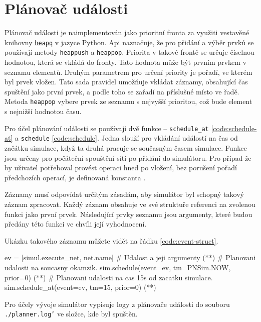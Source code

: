 \section{Plánovač události}
\label{sec:event-planner}

Plánovač události je naimplementován jako prioritní fronta za využiti vestavěné knihovny \href{https://docs.python.org/3/library/heapq.html}{\texttt{heapq}} v jazyce Python. Api naznačuje, že pro přidání a výběr prvků se používají metody \texttt{heappush} a \texttt{heappop}. Priorita v takové frontě se určuje číselnou hodnotou, která se vkládá do fronty. Tato hodnota může být prvním prvkem v seznamu elementů. Druhým parametrem pro určení priority je pořadí, ve kterém byl prvek vložen. Tato sada pravidel umožňuje vkládat záznamy, obsahující čas spuštění jako první prvek, a podle toho se zařadí na příslušné místo ve řadě. Metoda \texttt{heappop} vybere prvek ze seznamu s nejvyšší prioritou, což bude element s nejnižší hodnotou času.

Pro účel plánování události se používají dvě funkce -- \texttt{schedule\_at} \ref{code:schedule-at} a \texttt{schedule} \ref{code:schedule}. Jedna slouží pro vkládání událostí na čas od začátku simulace, když ta druhá pracuje se současným časem simulace. Funkce jsou určeny pro počáteční spouštění sítí po přidání do simulátoru. Pro případ že by uživatel potřeboval provést operaci hned po vložení, bez porušení pořadí předchozích operací, je definovaná konstanta .

Záznamy musí odpovídat určitým zásadám, aby simulátor byl schopný takový záznam zpracovat. Každý záznam obsahuje ve své struktuře referenci na zvolenou funkci jako první prvek. Následující prvky seznamu jsou argumenty, které budou předány této funkci ve chvíli její vyhodnocení.

Ukázku takového záznamu můžete vidět na řádku \ref{code:event-struct}.

\begin{python}
 ev = [simul.execute_net, net.name] # Udalost a jeji argumenty (*\label{code:event-struct}*)
 # Planovani udalosti na soucasny okamzik.
 sim.schedule(event=ev, tm=PNSim.NOW, prior=0) (*\label{code:schedule}*)
 # Planovani udalosti na cas 15s od zacatku simulace.
 sim.schedule_at(event=ev, tm=15, prior=0) (*\label{code:schedule-at}*)
\end{python}

Pro účely vývoje simulátor vypisuje logy z plánovače události do souboru \texttt{./planner.log'} ve složce, kde byl spuštěn.


